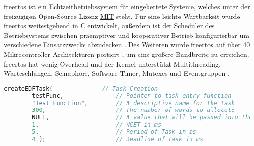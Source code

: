 \documentclass[../EDF Master Thesis.tex]{subfiles}
\begin{document}
\ac{freertos} ist ein Echtzeitbetriebssystem für eingebettete Systeme, welches unter der freizügigen Open-Source Lizenz \href{https://de.wikipedia.org/wiki/MIT-Lizenz}{MIT} steht.
Für eine leichte Wartbarkeit wurde \ac{freertos} weitestgehend in C entwickelt, außerdem ist der Scheduler des Betriebsystems zwischen präemptiver und kooperativer Betrieb konfigurierbar um verschiedene Einsatzzwecke abzudecken \parencite{wiki:002}.
Des Weiteren wurde \ac{freertos} auf über 40 Mikrocontroller-Architekturen portiert \parencite{freertos}, um eine größere Bandbreite zu erreichen.
\ac{freertos} hat wenig Overhead und der Kernel unterstützt Multithreading, Warteschlangen, Semaphore, Software-Timer, Mutexes und Eventgruppen \parencite{freertos-features}.




\begin{lstlisting}[language=C, caption=FreeRTOS Task creation and deletion]
    createEDFTask(              // Task Creation
        testFunc,               // Pointer to task entry function
        "Test Function",        // A descriptive name for the task
        300,                    // The number of words to allocate
        NULL,                   // A value that will be passed into the task 
        1,                      // WCET in ms
        5,                      // Period of Task in ms
        4 );                    // Deadline of Task in ms
    \end{lstlisting}
\end{document}

